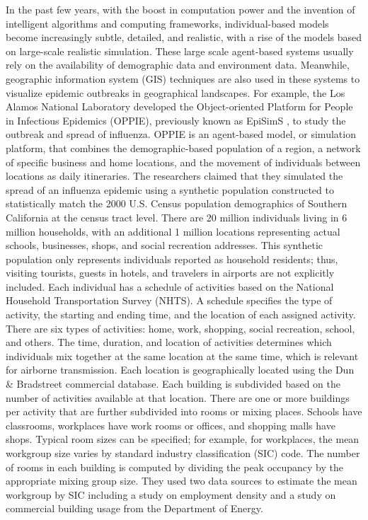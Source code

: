 \documentclass[8pt,twocolumn]{extarticle}
\begin{document}
In the past few years, with the boost in computation power and the invention of intelligent algorithms and computing
frameworks, individual-based models become increasingly subtle, detailed, and realistic, with a rise of the models based on large-scale realistic simulation. These large scale agent-based systems usually rely on the availability of demographic data and environment data. Meanwhile, geographic information system (GIS) techniques are also used in these systems to visualize epidemic outbreaks in geographical landscapes. For example, the Los Alamos National Laboratory developed the Object-oriented Platform for People in Infectious Epidemics (OPPIE), previously known as EpiSimS \cite{EpiSimS1,EpiSimS2,EpiSimS3}, to study the outbreak and spread of influenza. OPPIE is an agent-based model, or simulation platform, that combines the demographic-based population of a region, a network of specific business and home locations, and the movement of individuals between locations as daily itineraries. The researchers claimed that they simulated the spread of an influenza epidemic using a synthetic population constructed to statistically match the 2000 U.S. Census population demographics of Southern California at the census tract level. There are 20 million individuals living in 6 million households, with an additional 1 million locations representing actual schools, businesses, shops, and social recreation addresses. This synthetic population only represents individuals reported as household residents; thus, visiting tourists, guests in hotels, and travelers in airports are not explicitly included. Each individual has a schedule of activities based on the National Household Transportation Survey (NHTS). A schedule specifies the type of activity, the starting and ending time, and the location of each assigned activity. There are six types of activities: home, work, shopping, social recreation, school, and others. The time, duration, and location of activities determines which individuals mix together at the same location at the same time, which is relevant for airborne transmission. Each location is geographically located using the Dun \& Bradstreet commercial database. Each building is subdivided based on the number of activities available at that location. There are one or more buildings per activity that are further subdivided into rooms or mixing places. Schools have classrooms, workplaces have work rooms or offices, and shopping malls have shops. Typical room sizes can be specified; for example, for workplaces, the mean workgroup size varies by standard industry classification (SIC) code. The number of rooms in each building is computed by dividing the peak occupancy by the appropriate mixing group size. They used two data sources to estimate the mean workgroup by SIC including a study on employment density and a study on commercial building usage from the Department of Energy.
\end{document}
